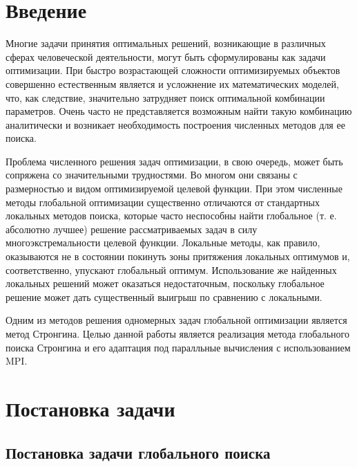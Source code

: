 \documentclass{article}
\begin{document}
\tableofcontents
\newpage

\section*{Введение}
\par Многие задачи принятия оптимальных решений, возникающие в различных сферах человеческой деятельности, могут быть сформулированы как задачи оптимизации. При быстро возрастающей сложности оптимизируемых объектов совершенно естественным является и усложнение их математических моделей, что, как следствие, значительно затрудняет поиск оптимальной комбинации параметров. Очень часто не представляется возможным найти такую комбинацию аналитически и возникает необходимость построения численных методов для ее поиска.
\par Проблема численного решения задач оптимизации, в свою очередь, может быть сопряжена со значительными трудностями. Во многом они связаны с размерностью и видом оптимизируемой целевой функции. При этом численные методы глобальной оптимизации существенно отличаются от стандартных локальных методов поиска, которые часто неспособны найти глобальное (т. е. абсолютно лучшее) решение рассматриваемых задач в силу многоэкстремальности целевой функции. Локальные методы, как правило, оказываются не в состоянии покинуть зоны притяжения локальных оптимумов и, соответственно, упускают глобальный оптимум. Использование же найденных локальных решений может оказаться недостаточным, поскольку глобальное решение может дать существенный выигрыш по сравнению с локальными.

\par Одним из методов решения одномерных задач глобальной оптимизации является метод Стронгина. Целью данной работы является реализация метода глобального поиска Стронгина и его адаптация под паралльные вычисления с использованием MPI.

\newpage

\section*{Постановка задачи}
\subsection*{Постановка задачи глобального поиска}
\end{document}
